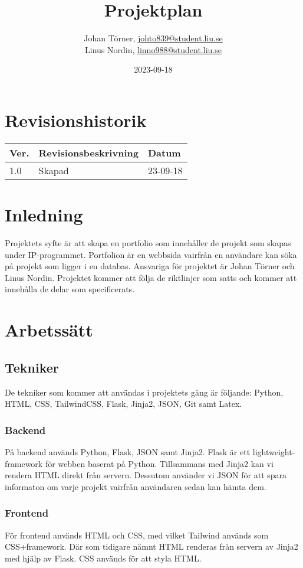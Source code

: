 \documentclass{TDP003mall}
\author{Johan Törner, \url{johto839@student.liu.se}\\
  Linus Nordin, \url{linno988@student.liu.se}}
\title{Projektplan}
\date{2023-09-18}
\begin{document}
\projectpage
\section{Revisionshistorik}
\begin{table}[!h]
\begin{tabularx}{\linewidth}{|l|X|l|}
\hline
Ver. & Revisionsbeskrivning & Datum \\\hline
1.0 & Skapad & 23-09-18\\\hline
\end{tabularx}
\end{table}


\section{Inledning}
Projektets syfte är att skapa en portfolio som innehåller de projekt som skapas under IP-programmet. 
Portfolion är en webbsida vairfrån en användare kan söka på projekt som ligger i en databas. Ansvariga för projektet 
är Johan Törner och Linus Nordin. Projektet kommer att följa de riktlinjer som satts och kommer att innehålla de delar
som specificerats. 


\section{Arbetssätt}

\subsection{Tekniker}
De tekniker som kommer att användas i projektets gång är följande: Python, HTML, CSS, TailwindCSS, Flask, Jinja2, JSON, Git samt Latex. 

\subsubsection{Backend}
På backend används Python, Flask, JSON samt Jinja2. Flask är ett lightweight-framework för webben baserat på Python.
Tillsammans med Jinja2 kan vi rendera HTML direkt från servern. Dessutom använder vi JSON för att spara informaton om varje projekt vairfrån
användaren sedan kan hämta dem.

\subsubsection{Frontend}
För frontend används HTML och CSS, med vilket Tailwind används som CSS+framework.
Där som tidigare nämnt HTML renderas från servern av Jinja2 med hjälp av Flask. CSS används för att styla HTML. 
\end{document}
